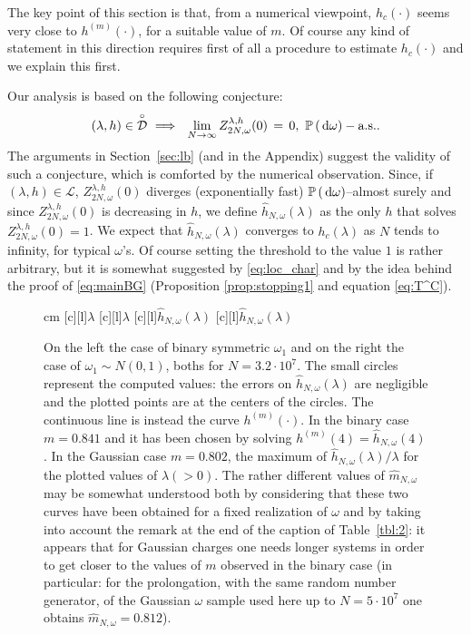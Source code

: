 \documentclass[reqno,11pt]{amsart}
\numberwithin{equation}{section}
\newcommand{\cL}{{\ensuremath{\mathcal L}} }
\newcommand{\cD}{{\ensuremath{\mathcal D}} }
\newcommand{\dd}{\,\text{\rm d}}             %
\newcommand{\bbP}{{\ensuremath{\mathbb P}} }
\newcommand{\go}{\omega}
\newcommand{\gl}{\lambda}
\begin{document}
The key point of this section is that, from a numerical viewpoint,
$h_c(\cdot)$ seems very close to $h^{(m)}(\cdot)$, for a suitable
value of $m$. Of course any kind of
 statement in this direction
 requires first of all a procedure to estimate $h_c(\cdot)$ and
we explain this first.

Our analysis is based on the following
conjecture:
\begin{equation}
\label{eq:conject_h}
(\gl, h)\in \overset{\circ}{\cD} \, \, \Longrightarrow \ \
\lim_{N \to \infty }Z_{2N, \go}^{\gl, h} (0) \, =\, 0, \ \bbP \left( \dd \go \right)-\text{a.s.}.
\end{equation}
The
 arguments in Section~\ref{sec:lb} (and in the Appendix)
suggest the validity of such a conjecture, which  is  comforted  by the numerical observation.
Since, if $(\gl, h)\in \cL$,  $Z_{2N, \go}^{\gl, h} (0)$ diverges (exponentially fast)
$\bbP \left( \dd \go \right)$--almost surely and since $Z_{2N, \go}^{\gl, h} (0)$
is decreasing  in $h$, we define $\hat h _{N, \go} (\gl)$ as the only $h$ that solves
$ Z_{2N, \go}^{\gl, h} (0)=1$.
We expect that $\hat h _{N, \go} (\gl)$ converges to $h_c(\gl)$
as $N$ tends to infinity, for typical $\go$'s.
Of course setting the threshold to the value $1$ is rather arbitrary, but it is
somewhat suggested by \eqref{eq:loc_char} and by  the idea behind
the proof of \eqref{eq:mainBG} (Proposition  \ref{prop:stopping1} and
equation
\eqref{eq:T^C}).

\begin{figure}[h]
\begin{center}
\leavevmode
{} cm
\psfragscanon
{}[c][l]{$\gl$}
[c][l]{$\gl$}
[c][l]{$\hat h _{N,\go}(\gl)$}
[c][l]{$\hat h _{N,\go}(\gl)$}
\end{center}
\caption{
\label{fig:sec5_1}
On the left the case of binary symmetric $\go_1$ and on the right
the case of $\go_1 \sim N(0,1)$, boths for $N= 3.2\cdot 10^7$.
The small circles represent the computed values: the errors on $\hat h _{N,\go}(\gl)$
are
negligible and the plotted points are at the centers of the circles. The continuous
line is instead the curve $h^{(m)}(\cdot)$. In the binary case $m=0.841$ and it has been chosen
by solving $h^{(m)}(4)=\hat h _{N,\go}(4)$. In the Gaussian case $m=0.802$, the maximum
of $ \hat h _{N,\go}(\gl)/\gl$ for the plotted values of $\gl(>0)$.
The rather different values of $\hat m_{N, \go}$ may be somewhat understood
both by considering that these two curves have been obtained for a fixed
realization of $\go$ and by taking into account the remark at the end of the caption
of Table~\ref{tbl:2}: it appears that for  Gaussian charges one needs longer systems in order to get closer
to the values of $m$ observed in the binary case (in particular: for the prolongation,
with the same random
number generator,
of the Gaussian $\go$ sample used here up to $N=5\cdot 10^{7}$ one
obtains $\hat m_{N, \go}=0.812$).
}
\end{figure}
\end{document}
